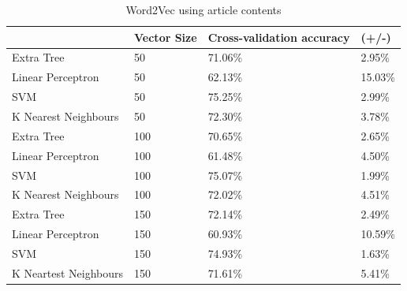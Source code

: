 \documentclass[a4paper,11pt]{report}
\begin{document}
\begin{table}[]
\centering
\caption{Word2Vec using article contents}
\label{w2v-article-content}
\begin{tabular}{|l|l|l|l|}
\hline
                      & Vector Size & Cross-validation accuracy & (+/-)  \\ \hline
Extra Tree            & 50          & 71.06\%                   & 2.95\% \\ \hline
Linear Perceptron     & 50          & 62.13\%                   & 15.03\% \\ \hline
SVM                   & 50          & 75.25\%                   & 2.99\% \\ \hline
K Nearest Neighbours  & 50          & 72.30\%                   & 3.78\% \\ \hline
Extra Tree            & 100         & 70.65\%                   & 2.65\% \\ \hline
Linear Perceptron     & 100         & 61.48\%                   & 4.50\% \\ \hline
SVM                   & 100         & 75.07\%                   & 1.99\% \\ \hline
K Nearest Neighbours  & 100         & 72.02\%                   & 4.51\% \\ \hline
Extra Tree            & 150         & 72.14\%                   & 2.49\% \\ \hline
Linear Perceptron     & 150         & 60.93\%                   & 10.59\% \\ \hline
SVM                   & 150         & 74.93\%                   & 1.63\% \\ \hline
K Neartest Neighbours & 150         & 71.61\%                   & 5.41\% \\ \hline
\end{tabular}
\end{table}
\end{document}
